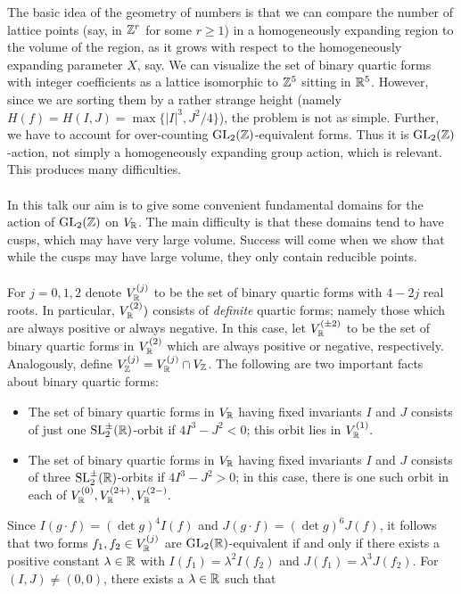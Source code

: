 \documentclass[12pt,amsfont]{amsart}
\begin{document}
The basic idea of the geometry of numbers is that we can compare the number of lattice points (say, in ${\mathbb Z}^r$ for some $r \geq 1$) in a homogeneously expanding region to the volume of the region, as it grows with respect to the homogeneously expanding parameter $X$, say. We can visualize the set of binary quartic forms with integer coefficients as a lattice isomorphic to ${\mathbb Z}^5$ sitting in ${\mathbb R}^5$. However, since we are sorting them by a rather strange height (namely $H(f) = H(I,J) = \max\{|I|^3, J^2/4\}$), the problem is not as simple. Further, we have to account for over-counting $\operatorname{GL}_2({\mathbb Z})$-equivalent forms. Thus it is $\operatorname{GL}_2({\mathbb Z})$-action, not simply a homogeneously expanding group action, which is relevant. This produces many difficulties. \\ \\
In this talk our aim is to give some convenient fundamental domains for the action of $\operatorname{GL}_2({\mathbb Z})$ on $V_{\mathbb R}$. The main difficulty is that these domains tend to have cusps, which may have very large volume. Success will come when we show that while the cusps may have large volume, they only contain reducible points. \\ \\
For $j = 0,1,2$ denote $V_{\mathbb R}^{(j)}$ to be the set of binary quartic forms with $4 - 2j$ real roots. In particular, $V_{\mathbb R}^{(2)})$ consists of \emph{definite} quartic forms; namely those which are always positive or always negative. In this case, let $V_{\mathbb R}^{(\pm 2)}$ to be the set of binary quartic forms in $V_{\mathbb R}^{(2)}$ which are always positive or negative, respectively. Analogously, define $V_{\mathbb Z}^{(j)} = V_{\mathbb R}^{(j)} \cap V_{\mathbb Z}$. The following are two important facts about binary quartic forms:
\begin{itemize}
\item The set of binary quartic forms in $V_{\mathbb R}$ having fixed invariants $I$ and $J$ consists of just one $\operatorname{SL}_2^{\pm}({\mathbb R})$-orbit if $4I^3 - J^2 < 0$; this orbit lies in $V_{\mathbb R}^{(1)}.$
\item The set of binary quartic forms in $V_{\mathbb R}$ having fixed invariants $I$ and $J$ consists of three $\operatorname{SL}_2^{\pm}({\mathbb R})$-orbits if $4I^3 - J^2 > 0$; in this case, there is one such orbit in each of $V_{\mathbb R}^{(0)}, V_{\mathbb R}^{(2+)}, V_{\mathbb R}^{(2-)}.$ 
\end{itemize}
Since $I(g \cdot f) = (\det g)^4 I(f)$ and $J(g \cdot f) = (\det g)^6 J(f)$, it follows that two forms $f_1, f_2 \in V_{\mathbb R}^{(j)}$ are $\operatorname{GL}_2({\mathbb R})$-equivalent if and only if there exists a positive constant $\lambda \in {\mathbb R}$ with $I(f_1) = \lambda^2 I(f_2)$ and $J(f_1) = \lambda^3 J(f_2)$. For $(I,J) \ne (0,0)$, there exists a $\lambda \in {\mathbb R}$ such that
\end{document}
